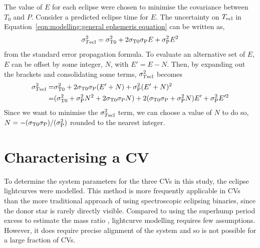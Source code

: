 The value of $E$ for each eclipse were chosen to minimise the covariance between $T_0$ and $P$.
Consider a predicted eclipse time for $E$. The uncertainty on $T_{\rm ecl}$ in Equation~\ref{eqn:modelling:general ephemeris equation} can be written as,
\begin{equation}
    \sigma_{T{\rm ecl}}^2 = \sigma_{\rm T0}^2 + 2\sigma_{\rm T0} \sigma_{\rm P}E + \sigma_{\rm P}^2 E^2
\end{equation}
from the standard error propagation formula.
To evaluate an alternative set of $E$, $E$ can be offset by some integer, $N$, with $E' = E - N$. Then, by expanding out the brackets and consolidating some terms, $\sigma_{T{\rm ecl}}^2$ becomes
\begin{align*}
    \sigma_{T{\rm ecl}}^2 =& \sigma_{\rm T0}^2 + 2\sigma_{\rm T0} \sigma_{\rm P}(E'+N) + \sigma_{\rm P}^2 (E'+N)^2 \\
    =& (\sigma_{\rm T0}^2 + \sigma_{\rm P}^2 N^2 + 2\sigma_{\rm T0} \sigma_{\rm P} N) + 2(\sigma_{\rm T0} \sigma_{\rm P} + \sigma_{\rm P}^2 N)E' + \sigma_{\rm P}^2 E'^2
\end{align*}
Since we want to minimise the $\sigma_{T{\rm ecl}}^2$ term, we can choose a value of $N$ to do so, $N = -(\sigma_{\rm T0}\sigma_{\rm P})/(\sigma_{\rm P}^2)$ rounded to the nearest integer.


\section{Characterising a CV}
\label{sect:method:lightcurve modelling}

To determine the system parameters for the three CVs in this study, the eclipse lightcurves were modelled. This method is more frequently applicable in CVs than the more traditional approach of using spectroscopic eclipsing binaries, since the donor star is rarely directly visible. Compared to using the superhump period excess to estimate the mass ratio \citep{patterson2005, knigge2006}, lightcurve modelling requires few assumptions. However, it does require precise alignment of the system and so is not possible for a large fraction of CVs.

